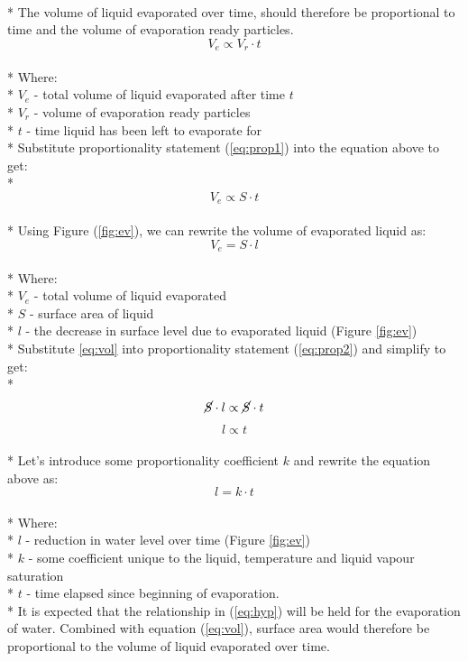 \documentclass[12pt,letterpaper,final]{report}
\begin{document}
\medskip
\\* The volume of liquid evaporated over time, should therefore be proportional to time and the volume of evaporation ready particles. 
\medskip
\begin{equation}\label{eq:prop2}
V_{e} \propto V_{r}\cdot t 
\end{equation}
\\* Where:
\medskip
\\* $V_{e}$ - total volume of liquid evaporated after time $t$
\\* $V_{r}$ - volume of evaporation ready particles
\\* $t$ - time liquid has been left to evaporate for 
\medskip
\\* Substitute proportionality statement (\ref{eq:prop1}) into the equation above to get:
\medskip
\\* $$ V_{e} \propto S\cdot t$$
\medskip
\\* Using Figure (\ref{fig:ev}), we can rewrite the volume of evaporated liquid as:
\begin{equation}\label{eq:vol}
V_{e} = S\cdot l 
\end{equation}
\medskip
\\* Where:
\medskip
\\* $V_{e}$ - total volume of liquid evaporated
\\* $S$ - surface area of liquid
\\* $l$ - the decrease in surface level due to evaporated liquid (Figure  \ref{fig:ev})
\medskip
\\* Substitute \ref{eq:vol} into proportionality statement (\ref{eq:prop2}) and simplify to get:
\\* $$\cancel{S}\cdot l \propto \cancel{S}\cdot t $$
\begin{equation*}
l \propto t
\end{equation*}
\medskip
\\* Let's introduce some proportionality coefficient $k$ and rewrite the equation above as:
\begin{equation}\label{eq:hyp}
l = k\cdot t
\end{equation}
\medskip
\\* Where:
\\* $l$ - reduction in water level over time (Figure \ref{fig:ev})
\\* $k$ - some coefficient unique to the liquid, temperature and liquid vapour saturation
\\* $t$ - time elapsed since beginning of evaporation.
\medskip
\\* It is expected that the relationship in (\ref{eq:hyp}) will be held for the evaporation of water. Combined with equation (\ref{eq:vol}), surface area would therefore be proportional to the volume of liquid evaporated over time.
\end{document}
